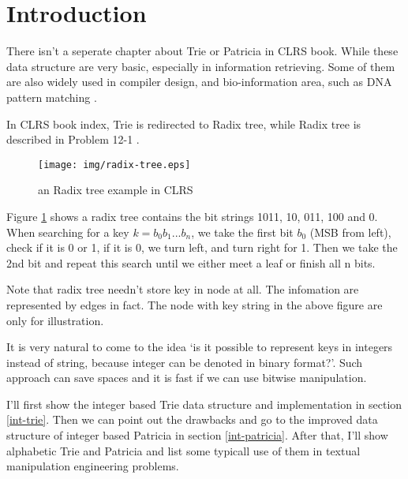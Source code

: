 \documentclass{article}
\begin{document}

\maketitle

\section{Introduction}
\label{introduction}

There isn't a seperate chapter about Trie or Patricia
in CLRS book. While these data structure are very basic, especially in
information retrieving. Some of them are also widely used in
compiler design\cite{okasaki-int-map}, and bio-information area, such as
DNA pattern matching \cite{wiki-suffix-tree}.

In CLRS book index, Trie is redirected to Radix tree, while Radix tree
is described in Problem 12-1 \cite{CLRS}.

\begin{figure}[htbp]
       \begin{center}
	\texttt{[image: img/radix-tree.eps]}
        \caption{an Radix tree example in CLRS} \label{fig:radix-tree}
       \end{center}
\end{figure}

Figure \ref{fig:radix-tree} shows a radix tree contains the bit
strings 1011, 10, 011, 100 and 0. When searching for a key $k=b_0b_1...b_n$, we
take the first bit $b_0$ (MSB from left), check if it is 0 or 1, if it
is 0, we turn left, and turn right for 1. Then we take the 2nd bit and
repeat this search until we either meet a leaf or finish all n bits.

Note that radix tree needn't store key in node at all. The
infomation are represented by edges in fact. The node with key string
in the above figure are only for illustration.

It is very natural to come to the idea `is it possible to represent
keys in integers instead of string, because integer can be denoted in
binary format?'. Such approach can save spaces and it is fast if we
can use bitwise manipulation.

I'll first show the integer based Trie data structure and implementation in
section \ref{int-trie}. Then we can point out the drawbacks and go to
the improved data structure of integer based Patricia in
section \ref{int-patricia}.
After that, I'll show alphabetic Trie and Patricia and list some
typicall use of them in textual manipulation engineering problems.
\end{document}

